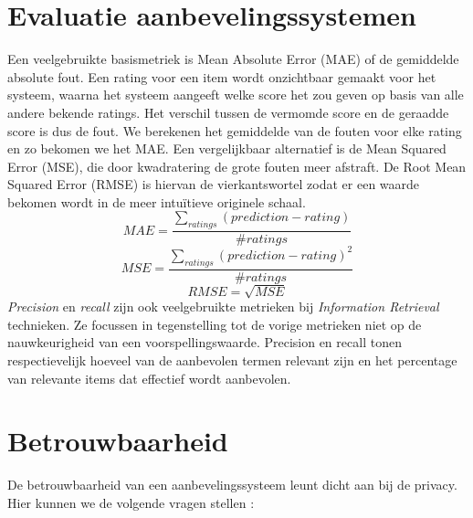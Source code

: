 \section{Evaluatie aanbevelingssystemen}
Een veelgebruikte basismetriek is Mean Absolute Error (MAE) of de gemiddelde absolute fout. Een rating voor een item wordt onzichtbaar gemaakt voor het systeem, waarna het systeem aangeeft welke score het zou geven op basis van alle andere bekende ratings. Het verschil tussen de vermomde score en de geraadde score is dus de fout. We berekenen het gemiddelde van de fouten voor elke rating en zo bekomen we het MAE. Een vergelijkbaar alternatief is de Mean Squared Error (MSE), die door kwadratering de grote fouten meer afstraft. De Root Mean Squared Error (RMSE) is hiervan de vierkantswortel zodat er een waarde bekomen wordt in de meer intu\"itieve originele schaal.
\begin{equation}
MAE = \frac{\sum_{ratings} (prediction - rating)}{\#ratings}
\end{equation}
\begin{equation}MSE = \frac{\sum_{ratings} (prediction - rating)^2}{\#ratings}
\end{equation}
\begin{equation}
RMSE = \sqrt{MSE}
\end{equation}
\textit{Precision} en \emph{recall} zijn ook veelgebruikte metrieken bij \emph{Information Retrieval} technieken. Ze focussen in tegenstelling tot de vorige metrieken niet op de nauwkeurigheid van een voorspellingswaarde. Precision en recall tonen respectievelijk hoeveel van de aanbevolen termen relevant zijn en het percentage van relevante items dat effectief wordt aanbevolen.




\section{Betrouwbaarheid}
De betrouwbaarheid van een aanbevelingssysteem leunt dicht aan bij de privacy. Hier kunnen we de volgende vragen stellen : 

